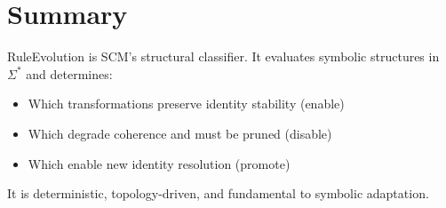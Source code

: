 \section{Summary}

RuleEvolution is SCM's structural classifier.  
It evaluates symbolic structures in $\Sigma^*$ and determines:

\begin{itemize}
  \item Which transformations preserve identity stability (enable)
  \item Which degrade coherence and must be pruned (disable)
  \item Which enable new identity resolution (promote)
\end{itemize}

It is deterministic, topology-driven, and fundamental to symbolic adaptation.
